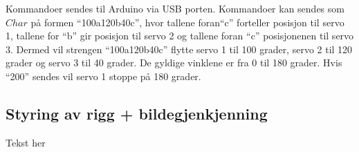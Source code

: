 Kommandoer sendes til Arduino via USB porten. Kommandoer kan sendes som $Char$ på formen ``100a120b40c'', hvor tallene foran``c'' forteller posisjon til servo 1, tallene for ``b'' gir posisjon til servo 2 og tallene foran ``c'' posisjonenen til servo 3. Dermed vil strengen ``100a120b40c'' flytte servo 1 til 100 grader, servo 2 til 120 grader og servo 3 til 40 grader. De gyldige vinklene er fra 0 til 180 grader. Hvis ``200'' sendes vil servo 1 stoppe på 180 grader. 


\subsection{Styring av rigg + bildegjenkjenning}

Tekst her
